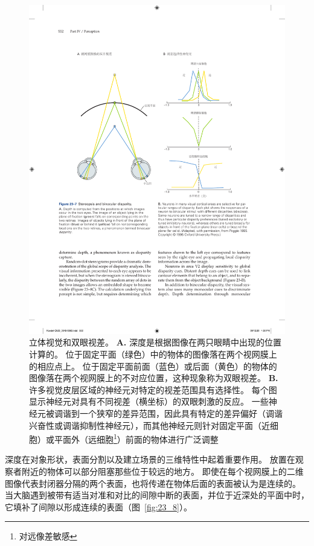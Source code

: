 \begin{figure}[htbp]
	\centering
	\includegraphics[width=1.0\linewidth]{chap23/fig_23_7}
	\caption{立体视觉和双眼视差。
		\textbf{A.} 深度是根据图像在两只眼睛中出现的位置计算的。
		位于固定平面（绿色）中的物体的图像落在两个视网膜上的相应点上。
		位于固定平面前面（蓝色）或后面（黄色）的物体的图像落在两个视网膜上的不对应位置，这种现象称为双眼视差。
		\textbf{B.} 许多视觉皮层区域的神经元对特定的视差范围具有选择性。
		每个图显示神经元对具有不同视差（横坐标）的双眼刺激的反应。
		一些神经元被调谐到一个狭窄的差异范围，因此具有特定的差异偏好（调谐兴奋性或调谐抑制性神经元），而其他神经元则针对固定平面（近细胞）或平面外（远细胞\footnote{对远像差敏感}）前面的物体进行广泛调整\cite{poggio1995mechanisms}}
	\label{fig:23_7}
\end{figure}



深度在对象形状，表面分割以及建立场景的三维特性中起着重要作用。
放置在观察者附近的物体可以部分阻塞那些位于较远的地方。
即使在每个视网膜上的二维图像代表封闭器分隔的两个表面，也将传递在物体后面的表面被认为是连续的。
当大脑遇到被带有适当对准和对比的间隙中断的表面，并位于近深处的平面中时，它填补了间隙以形成连续的表面（图~\ref{fig:23_8}）。


